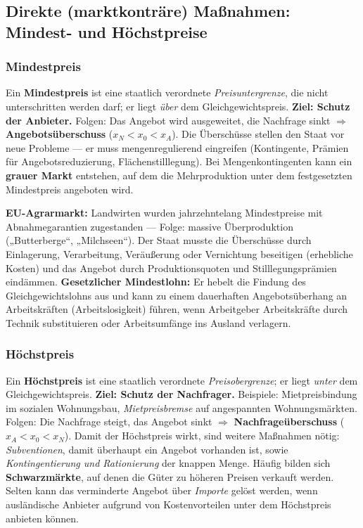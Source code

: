 \documentclass[11pt, a4paper]{article}
\begin{document}
\subsection{Direkte (marktkonträre) Maßnahmen: Mindest- und Höchstpreise}

\subsubsection{Mindestpreis}

Ein \textbf{Mindestpreis} ist eine staatlich verordnete \emph{Preisuntergrenze}, die
nicht unterschritten werden darf; er liegt \emph{über} dem Gleichgewichtspreis.
\textbf{Ziel: Schutz der Anbieter.} Folgen: Das Angebot wird ausgeweitet, die Nachfrage
sinkt $\Rightarrow$ \textbf{Angebotsüberschuss} ($x_N < x_0 < x_A$). Die Überschüsse
stellen den Staat vor neue Probleme --- er muss mengenregulierend eingreifen
(Kontingente, Prämien für Angebotsreduzierung, Flächenstilllegung). Bei
Mengenkontingenten kann ein \textbf{grauer Markt} entstehen, auf dem die Mehrproduktion
unter dem festgesetzten Mindestpreis angeboten wird.

\begin{beispiel}
\textbf{EU-Agrarmarkt:} Landwirten wurden jahrzehntelang Mindestpreise mit
Abnahmegarantien zugestanden --- Folge: massive Überproduktion („Butterberge``,
„Milchseen``). Der Staat musste die Überschüsse durch Einlagerung, Verarbeitung,
Veräußerung oder Vernichtung beseitigen (erhebliche Kosten) und das Angebot durch
Produktionsquoten und Stilllegungsprämien eindämmen.
\textbf{Gesetzlicher Mindestlohn:} Er hebelt die Findung des Gleichgewichtslohns aus und
kann zu einem dauerhaften Angebotsüberhang an Arbeitskräften (Arbeitslosigkeit) führen,
wenn Arbeitgeber Arbeitskräfte durch Technik substituieren oder Arbeitsumfänge ins
Ausland verlagern.
\end{beispiel}

\subsubsection{Höchstpreis}

Ein \textbf{Höchstpreis} ist eine staatlich verordnete \emph{Preisobergrenze}; er liegt
\emph{unter} dem Gleichgewichtspreis. \textbf{Ziel: Schutz der Nachfrager.} Beispiele:
Mietpreisbindung im sozialen Wohnungsbau, \emph{Mietpreisbremse} auf angespannten
Wohnungsmärkten. Folgen: Die Nachfrage steigt, das Angebot sinkt $\Rightarrow$
\textbf{Nachfrageüberschuss} ($x_A < x_0 < x_N$). Damit der Höchstpreis wirkt, sind
weitere Maßnahmen nötig: \emph{Subventionen}, damit überhaupt ein Angebot vorhanden ist,
sowie \emph{Kontingentierung und Rationierung} der knappen Menge. Häufig bilden sich
\textbf{Schwarzmärkte}, auf denen die Güter zu höheren Preisen verkauft werden. Selten
kann das verminderte Angebot über \emph{Importe} gelöst werden, wenn ausländische
Anbieter aufgrund von Kostenvorteilen unter dem Höchstpreis anbieten können.
\end{document}
